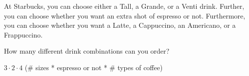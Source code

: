 \question At Starbucks, you can choose either a Tall, a Grande, or 
a Venti drink. Further, you can choose whether you want an extra 
shot of espresso or not. Furthermore, you can choose whether you
want a Latte, a Cappuccino, an Americano, or a Frappuccino. 

How many different drink combinations can you order?
\begin{solution}
    $3 \cdot 2 \cdot 4$ (\# sizes * espresso or not * \# types of coffee)
\end{solution}